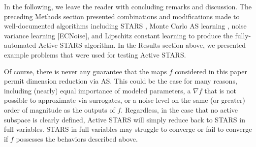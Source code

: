 \documentclass{amsart}
\begin{document}
In the following, we leave the reader with concluding remarks and discussion. The preceding Methods section presented combinations and modifications made to well-documented algorithms including STARS \cite{CW}, Monte Carlo AS learning \cite{ConstantineMC}, noise variance learning [ECNoise], and Lipschitz constant learning \cite{Calliess} to produce the fully-automated Active STARS algorithm. In the Results section above, we presented example problems that were used for testing Active STARS.

Of course, there is never any guarantee that the maps $f$ considered in this paper permit dimension reduction via AS. This could be the case for many reasons, including (nearly) equal importance of modeled parameters, a $\nabla f$ that is not possible to approximate via surrogates, or a noise level on the same (or greater) order of magnitude as the outputs of $f$. Regardless, in the case that no active subspace is clearly defined, Active STARS will simply reduce back to STARS in full variables. STARS in full variables may struggle to converge or fail to converge if $f$ possesses the behaviors described above.
\end{document}
